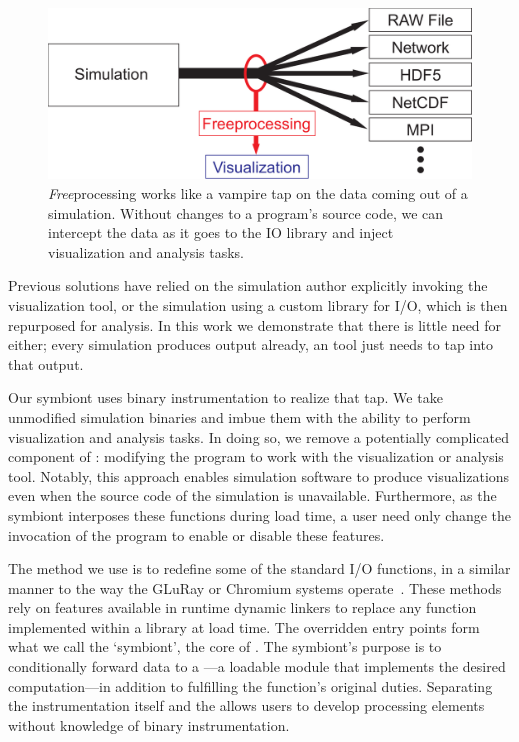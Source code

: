 \begin{figure}
  \centering
  \includegraphics[width=0.95\linewidth]{images/fp/fp}
  \caption{\textit{Free}processing works like a vampire tap on the data
  coming out of a simulation.  Without changes to a program's source
  code, we can intercept the data as it goes to the IO library and
  inject visualization and analysis tasks.}
  \label{fig:interchange}
\end{figure}

Previous \insitu{} solutions have relied on the simulation author
explicitly invoking the visualization tool, or the simulation using a
custom library for I/O, which is then repurposed for analysis.  In this
work we demonstrate that there is little need for
either; every simulation produces output already, an \insitu{} tool
just needs to tap into that output.

Our symbiont uses binary instrumentation to realize that tap. We take
unmodified simulation binaries and imbue them with the ability to
perform visualization and analysis tasks.  In doing so, we remove a
potentially
complicated component of \insitu{}: modifying the program to work with
the visualization or analysis tool.  Notably, this approach
enables simulation software to produce \insitu{} visualizations even
when the source code of the simulation is unavailable.  Furthermore, as
the symbiont interposes these functions during load time, a user need
only change the invocation of the program to enable or disable these
features.


The method we use is to redefine some of the standard I/O functions, in
a similar manner to the way the
GLuRay or Chromium systems operate~\cite{Brownlee:2012:GLuRay,
Humphreys:2002:Chromium}.  These methods rely on features available in
runtime dynamic linkers to replace any function implemented within a
library at load time.  The overridden entry points form what we call
the `symbiont', the core of
\freeprocessing{}. The symbiont's purpose is to conditionally forward
data to a
\freeprocessor{}---a loadable module that implements the
desired \insitu{} computation---in addition to fulfilling the
function's original duties.  Separating the instrumentation itself and
the \freeprocessor{} allows users to develop processing elements
without knowledge of binary instrumentation.

